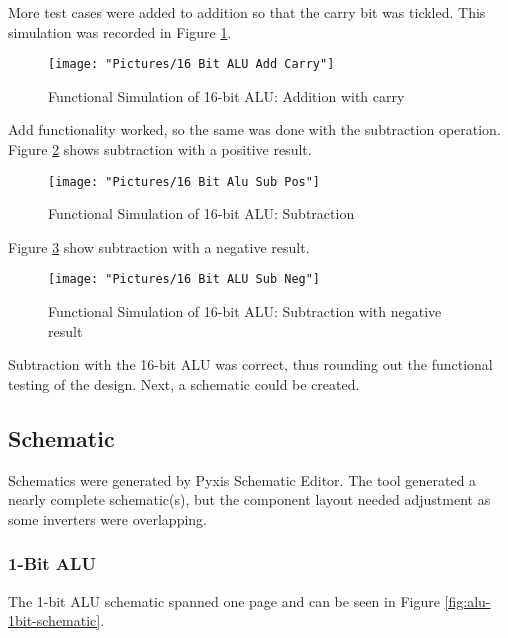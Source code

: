 \documentclass[11pt]{article}
\begin{document}
			More test cases were added to addition so that the carry bit was tickled. This simulation was recorded in Figure \ref{fig:16-bit-alu-add-carry}.
			
			\begin{figure}[H]
				\centering
				\texttt{[image: "Pictures/16 Bit ALU Add Carry"]}
				\caption{Functional Simulation of 16-bit ALU: Addition with carry}
				\label{fig:16-bit-alu-add-carry}
			\end{figure}
			
			Add functionality worked, so the same was done with the subtraction operation. Figure \ref{fig:16-bit-alu-sub-pos} shows subtraction with a positive result.
			
			\begin{figure}[H]
				\centering
				\texttt{[image: "Pictures/16 Bit Alu Sub Pos"]}
				\caption{Functional Simulation of 16-bit ALU: Subtraction}
				\label{fig:16-bit-alu-sub-pos}
			\end{figure}
		
			Figure \ref{fig:16-bit-alu-sub-neg} show subtraction with a negative result.
			
			\begin{figure}[H]
				\centering
				\texttt{[image: "Pictures/16 Bit ALU Sub Neg"]}
				\caption{Functional Simulation of 16-bit ALU: Subtraction with negative result}
				\label{fig:16-bit-alu-sub-neg}
			\end{figure}
		
			Subtraction with the 16-bit ALU was correct, thus rounding out the functional testing of the design. Next, a schematic could be created.

	\subsection{Schematic}
	
		Schematics were generated by Pyxis Schematic Editor. The tool generated a nearly complete schematic(s), but the component layout needed adjustment as some inverters were overlapping. 

		\subsubsection{1-Bit ALU}	
		
			The 1-bit ALU schematic spanned one page and can be seen in Figure \ref{fig:alu-1bit-schematic}. 
			
\end{document}
